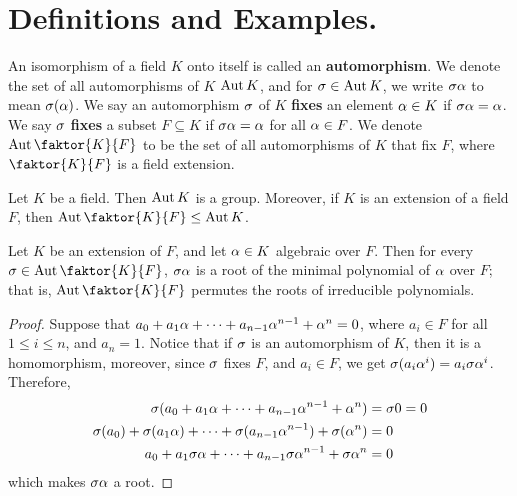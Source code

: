 \section{Definitions and Examples.}

\begin{definition}
    An isomorphism of a field $K$ onto itself is called an
    \textbf{automorphism}. We denote the set of all automorphisms of $K$
    $\operatorname{Aut}{K}$, and for $\sigma \in \operatorname{Aut}{K}$,  we write $\sigma\alpha$ to mean  $\sigma(\alpha)$. We
    say an automorphism $\sigma$ of  $K$  \textbf{fixes} an element $\alpha \in K$ if
    $\sigma\alpha=\alpha$. We say  $\sigma$  \textbf{fixes} a subset $F \subseteq K$ if
    $\sigma\alpha=\alpha$ for all  $\alpha \in F$. We denote  $\Aut{\faktor{K}{F}}$ to be the
    set of all automorphisms of $K$ that fix $F$, where $\faktor{K}{F}$ is a
    field extension.
\end{definition}

\begin{proposition}\label{2.1.1}
    Let $K$ be a field. Then  $\operatorname{Aut}{K}$ is a group. Moreover, if $K$ is an
    extension of a field $F$, then $\Aut{\faktor{K}{F}} \leq \Aut{K}$.
\end{proposition}

\begin{proposition}\label{2.1.2}
    Let $K$ be an extension of  $F$, and let  $\alpha \in K$ algebraic over  $F$.
    Then for every  $\s \in \Aut{\faktor{K}{F}}$, $\sigma\alpha$ is a root of the
    minimal polynomial of  $\alpha$ over  $F$; that is,  $\Aut{\faktor{K}{F}}$
    permutes the roots of irreducible polynomials.
\end{proposition}
\begin{proof}
    Suppose that $a_0+a_1\alpha+\dots+a_{n-1}\alpha^{n-1}+\alpha^n=0$, where $a_i \in F$
    for all  $1 \leq i \leq n$, and  $a_n=1$. Notice that if $\sigma$ is an
    automorphism of $K$, then it is a homomorphism, moreover, since $\sigma$ fixes
    $F$, and $a_i \in F$, we get $ \sigma(a_i\alpha^i)=a_i\sigma\alpha^i$. Therefore,
    \begin{align*}
        \sigma(a_0+a_1\alpha+\dots+a_{n-1}\alpha^{n-1}+\alpha^n)  &=  \sigma0=0   \\
        \sigma(a_0)+\sigma(a_1\alpha)+\dots+\sigma(a_{n-1}\alpha^{n-1})+\sigma(\alpha^n)  &=  0   \\
        a_0+a_1\sigma\alpha+\dots+a_{n-1}\sigma\alpha^{n-1}+\sigma\alpha^n  &=  0   \\
    \end{align*}
    which makes $\sigma\alpha$ a root.
\end{proof}

